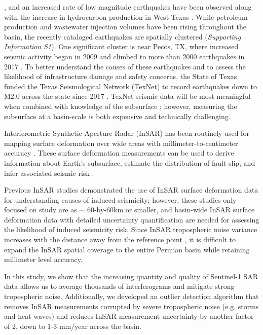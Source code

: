 \documentclass{utexasthesis}
\begin{document}
\cite{Ellsworth2013, simpson1988two}, and an increased rate of low magnitude earthquakes have been observed along with the increase in hydrocarbon production in West Texas \cite{Ellsworth2013, Frohlich2016historical, atkinson2016hydraulic, Frohlich2019, Lomax2019, savvaidis2020induced, skoumal2020induced}. While petroleum production and wastewater injection volumes have been rising throughout the basin, the recently cataloged earthquakes are spatially clustered (\textit{Supporting Information S1}). One significant cluster is near Pecos, TX, where increased seismic activity began in 2009 and climbed to more than 2000 earthquakes in 2017 \cite{Frohlich2019}. To better understand the causes of these earthquakes and to assess the likelihood of infrastructure damage and safety concerns, the State of Texas funded the Texas Seismological Network (TexNet) to record earthquakes down to M2.0 across the state since 2017 \cite{Savvaidis2019}. TexNet seismic data will be most meaningful when combined with knowledge of the subsurface \cite{academy2017environmental, CouncilInduced2013}; however, measuring the subsurface at a basin-scale is both expensive and technically challenging.

Interferometric Synthetic Aperture Radar (InSAR) has been routinely used for mapping surface deformation over wide areas with millimeter-to-centimeter accuracy \cite{Massonnet1993, burgmann2000synthetic}.  These surface deformation measurements can be used to derive information about Earth's subsurface, estimate the distribution of fault slip, and infer associated seismic risk \cite{Segall2010, Elliott2016, huang2017fault}. 



Previous InSAR studies demonstrated the use of InSAR surface deformation data for understanding causes of induced seismicity; however, these studies only focused on study are
as $ \sim $ 60-by-60km or smaller, and basin-wide InSAR surface deformation data with detailed uncertainty quantification are needed for assessing the likelihood of induced seismicity risk. Since InSAR tropospheric noise variance increases with the distance away from the reference point \cite{Emardson2003}, it is difficult to expand the InSAR spatial coverage to the entire Permian basin while retaining millimeter level accuracy. 

In this study, we show that the increasing quantity and quality of Sentinel-1 SAR data allows us to average thousands of interferograms and mitigate strong tropospheric noise. 
Additionally, we developed an outlier detection algorithm that removes InSAR measurements corrupted by severe tropospheric noise (e.g. storms and heat waves) and reduces InSAR measurement uncertainty by another factor of 2, down to 1-3 mm/year across the basin.
\end{document}
